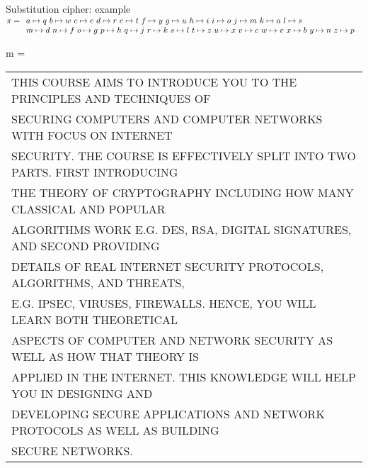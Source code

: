 \documentclass[aspectratio=169, lualatex, handout, 10pt,dvipsnames,svgnames]{beamer} %
\def\enbleu#1{\textcolor{bleu}{#1}}
\def\enrouge#1{\textcolor{rouge}{#1}}
\begin{document}
\begin{frame}{Substitution cipher: example}
  \vspace{-0.7cm}
    \enrouge{
    \scriptsize{$\pi=
      \begin{array}[t]{l}
        a\mapsto q\ b\mapsto w\ c\mapsto e\ d\mapsto r\ e\mapsto t\ f\mapsto y\ g\mapsto u\ h\mapsto i\ 
        i\mapsto o\ j\mapsto m\ k\mapsto a\ l\mapsto s \\ 
        m\mapsto d\ n\mapsto f\ o\mapsto g\ p\mapsto h\ q\mapsto j\ r\mapsto k\ s\mapsto l\ t\mapsto z\ 
        u\mapsto x\ v\mapsto c\ w\mapsto v\ x\mapsto b\  
        y\mapsto n\ z\mapsto p\
      \end{array}
      $}}
  \vspace{0.10cm}
  
  \enbleu{
    \scriptsize{m =
      \begin{tabular}[t]{l}
        THIS COURSE AIMS TO INTRODUCE YOU TO THE PRINCIPLES AND TECHNIQUES OF\\ 
        SECURING COMPUTERS AND COMPUTER NETWORKS WITH FOCUS ON INTERNET \\
        SECURITY. THE COURSE IS EFFECTIVELY SPLIT INTO TWO PARTS. FIRST INTRODUCING \\ 
       THE THEORY OF CRYPTOGRAPHY INCLUDING HOW MANY CLASSICAL AND POPULAR \\
        ALGORITHMS WORK E.G. DES, RSA, DIGITAL SIGNATURES, AND SECOND PROVIDING\\
         DETAILS OF REAL INTERNET SECURITY PROTOCOLS, ALGORITHMS, AND THREATS,\\
         E.G. IPSEC, VIRUSES, FIREWALLS. HENCE, YOU WILL LEARN BOTH THEORETICAL\\
        ASPECTS OF COMPUTER AND NETWORK SECURITY AS WELL AS HOW THAT THEORY IS \\
        APPLIED IN THE INTERNET. THIS KNOWLEDGE WILL HELP YOU IN DESIGNING AND \\ DEVELOPING SECURE APPLICATIONS AND NETWORK PROTOCOLS AS WELL AS 
        BUILDING \\ 
        SECURE NETWORKS.
      \end{tabular}
    }}
  \vspace{0.10cm}
  

\end{frame}
\end{document}
